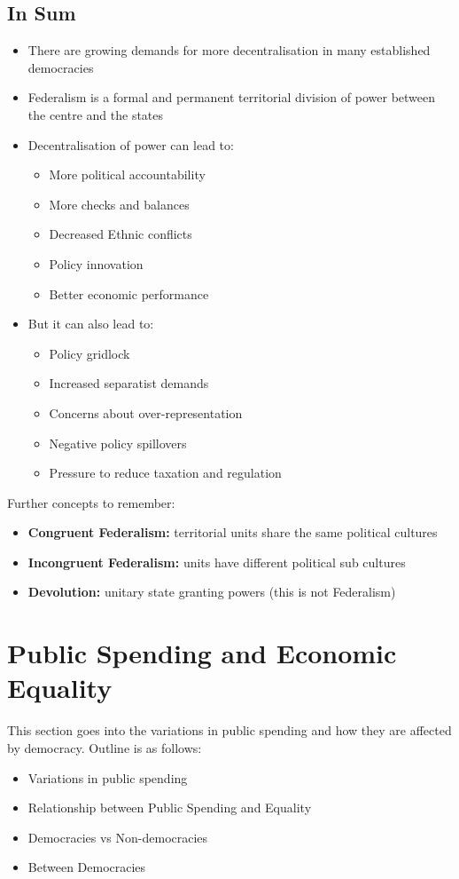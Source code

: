 \documentclass[12pt, letterpaper]{article}
\begin{document}
\subsection{In Sum}
\begin{itemize}
	\item There are growing demands for more decentralisation in many established democracies
	\item Federalism is a formal and permanent territorial division of power between the centre and the states
	\item Decentralisation of power can lead to:
		\begin{itemize}
			\item More political accountability
			\item More checks and balances
			\item Decreased Ethnic conflicts
			\item Policy innovation
			\item Better economic performance
		\end{itemize}
	\item But it can also lead to:
		\begin{itemize}
			\item Policy gridlock
			\item Increased separatist demands
			\item Concerns about over-representation
			\item Negative policy spillovers
			\item Pressure to reduce taxation and regulation
		\end{itemize}
\end{itemize}
Further concepts to remember:
\begin{itemize}
	\item \textbf{Congruent Federalism:} territorial units share the same political cultures
	\item \textbf{Incongruent Federalism:} units have different political sub cultures
	\item \textbf{Devolution:} unitary state granting powers (this is not Federalism)
\end{itemize}

\newpage
\section{Public Spending and Economic Equality}
This section goes into the variations in public spending and how they are affected by democracy. Outline is as follows:
\begin{itemize}
	\item Variations in public spending
	\item Relationship between Public Spending and Equality
	\item Democracies vs Non-democracies
	\item Between Democracies
\end{itemize}
\end{document}

